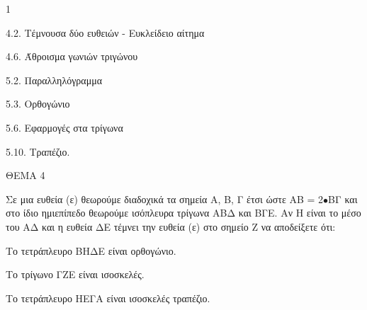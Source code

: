 \begin{ylh}{1}
    \item 4.2. Τέμνουσα δύο ευθειών - Ευκλείδειο αίτημα
    \item 4.6. Άθροισμα γωνιών τριγώνου
    \item 5.2. Παραλληλόγραμμα
    \item 5.3. Ορθογώνιο
    \item 5.6. Εφαρμογές στα τρίγωνα
    \item 5.10. Τραπέζιο.
\end{ylh}

ΘΕΜΑ 4

Σε μια ευθεία (ε) θεωρούμε διαδοχικά τα σημεία Α, Β, Γ έτσι ώστε ΑΒ = 2$\bullet$ΒΓ και στο ίδιο ημιεπίπεδο θεωρούμε ισόπλευρα τρίγωνα ΑΒΔ και ΒΓΕ. Αν Η είναι το μέσο του ΑΔ και η ευθεία ΔΕ τέμνει την ευθεία (ε) στο σημείο Ζ να αποδείξετε ότι:

\begin{alist}
\item Το τετράπλευρο ΒΗΔΕ είναι ορθογώνιο. 

\item Το τρίγωνο ΓΖΕ είναι ισοσκελές. 

\item Το τετράπλευρο ΗΕΓΑ είναι ισοσκελές τραπέζιο. 


\end{alist}
